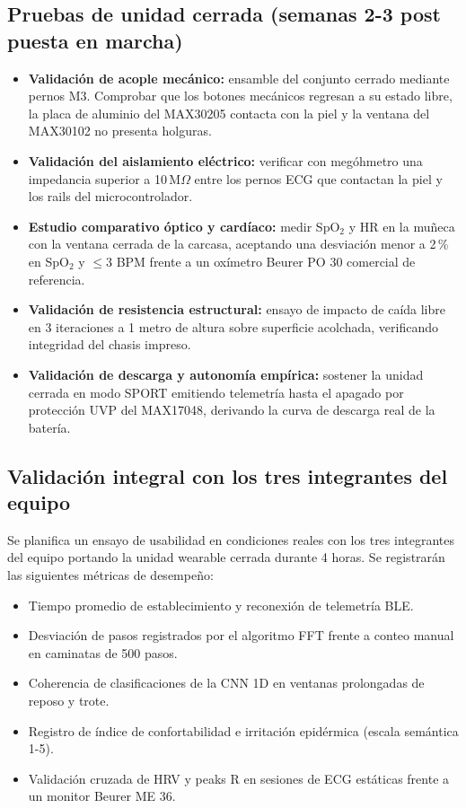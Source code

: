 \documentclass[letterpaper,11pt]{article}
\begin{document}
\subsection{Pruebas de unidad cerrada (semanas 2-3 post puesta en marcha)}

\begin{itemize}
    \item \textbf{Validación de acople mecánico:} ensamble del conjunto cerrado mediante pernos M3. Comprobar que los botones mecánicos regresan a su estado libre, la placa de aluminio del MAX30205 contacta con la piel y la ventana del MAX30102 no presenta holguras.
    \item \textbf{Validación del aislamiento eléctrico:} verificar con megóhmetro una impedancia superior a 10\,M$\Omega$ entre los pernos ECG que contactan la piel y los rails del microcontrolador.
    \item \textbf{Estudio comparativo óptico y cardíaco:} medir SpO$_2$ y HR en la muñeca con la ventana cerrada de la carcasa, aceptando una desviación menor a 2\,\% en SpO$_2$ y $\le 3$ BPM frente a un oxímetro Beurer PO 30 comercial de referencia.
    \item \textbf{Validación de resistencia estructural:} ensayo de impacto de caída libre en 3 iteraciones a 1 metro de altura sobre superficie acolchada, verificando integridad del chasis impreso.
    \item \textbf{Validación de descarga y autonomía empírica:} sostener la unidad cerrada en modo SPORT emitiendo telemetría hasta el apagado por protección UVP del MAX17048, derivando la curva de descarga real de la batería.
\end{itemize}

\subsection{Validación integral con los tres integrantes del equipo}

Se planifica un ensayo de usabilidad en condiciones reales con los tres integrantes del equipo portando la unidad wearable cerrada durante 4 horas. Se registrarán las siguientes métricas de desempeño:
\begin{itemize}
    \item Tiempo promedio de establecimiento y reconexión de telemetría BLE.
    \item Desviación de pasos registrados por el algoritmo FFT frente a conteo manual en caminatas de 500 pasos.
    \item Coherencia de clasificaciones de la CNN 1D en ventanas prolongadas de reposo y trote.
    \item Registro de índice de confortabilidad e irritación epidérmica (escala semántica 1-5).
    \item Validación cruzada de HRV y peaks R en sesiones de ECG estáticas frente a un monitor Beurer ME 36.
\end{itemize}
\end{document}
